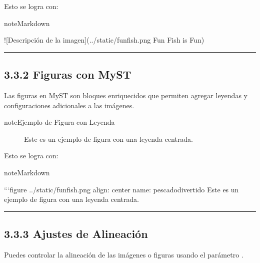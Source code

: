 \documentclass[a4paper,10pt,spanish]{sphinxmanual}
\begin{document}
\sphinxAtStartPar
Esto se logra con:

\begin{sphinxadmonition}{note}{Markdown}

\begin{sphinxVerbatim}[commandchars=\\\{\}]
![Descripción de la imagen](../\PYGZus{}static/fun\PYGZhy{}fish.png \PYGZdq{}Fun Fish is Fun\PYGZdq{})
\end{sphinxVerbatim}
\end{sphinxadmonition}


\bigskip\hrule\bigskip



\subsection{3.3.2 Figuras con MyST}
\label{\detokenize{3_guia_myst/imagenes_figuras:figuras-con-myst}}
\sphinxAtStartPar
Las figuras en MyST son bloques enriquecidos que permiten agregar leyendas y configuraciones adicionales a las imágenes.

\begin{sphinxadmonition}{note}{Ejemplo de Figura con Leyenda}

\begin{figure}[H]
\centering
\capstart

\noindent{}
\caption{Este es un ejemplo de figura con una leyenda centrada.}\label{\detokenize{3_guia_myst/imagenes_figuras:pescado-divertido}}\end{figure}
\end{sphinxadmonition}

\sphinxAtStartPar
Esto se logra con:

\begin{sphinxadmonition}{note}{Markdown}

\begin{sphinxVerbatim}[commandchars=\\\{\}]
```\PYGZob{}figure\PYGZcb{} ../\PYGZus{}static/fun\PYGZhy{}fish.png
\PYGZhy{}\PYGZhy{}\PYGZhy{}
align: center
name: pescado\PYGZhy{}divertido
\PYGZhy{}\PYGZhy{}\PYGZhy{}
Este es un ejemplo de figura con una leyenda centrada.
\end{sphinxVerbatim}
\end{sphinxadmonition}


\bigskip\hrule\bigskip



\subsection{3.3.3 Ajustes de Alineación}
\label{\detokenize{3_guia_myst/imagenes_figuras:ajustes-de-alineacion}}
\sphinxAtStartPar
Puedes controlar la alineación de las imágenes o figuras usando el parámetro .
\end{document}
